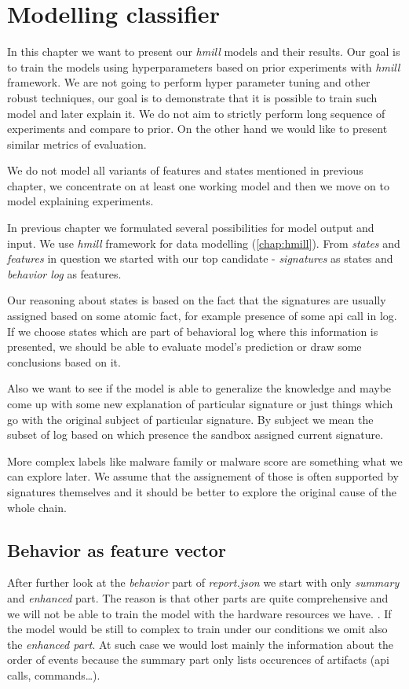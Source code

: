 \chapter{Modelling classifier} \label{chap:models}
In this chapter we want to present our \emph{hmill} models and their results. Our goal is to train the models using hyperparameters based on prior experiments with \emph{hmill} framework. We are not going to perform hyper parameter tuning and other robust techniques, our goal is to demonstrate that it is possible to train such model and later explain it. We do not aim to strictly perform long sequence of experiments and compare to prior. On the other hand we would like to present similar metrics of evaluation. 

We do not model all variants of features and states mentioned in previous chapter, we concentrate on at least one working model and then we move on to model explaining experiments.

In previous chapter we formulated several possibilities for model output and input. We use \emph{hmill} framework for data modelling (\ref{chap:hmill}). From \emph{states} and \emph{features} in question we started with our top candidate - \emph{signatures} as states and \emph{behavior log} as features. 

Our reasoning about states is based on the fact that the signatures are usually assigned based on some atomic fact, for example presence of some api call in log. If we choose states which are part of behavioral log where this information is presented, we should be able to evaluate model's prediction or draw some conclusions based on it. 

Also we want to see if the model is able to generalize the knowledge and maybe come up with some new explanation of particular signature or just things which go with the original subject of particular signature. By subject we mean the subset of log based on which presence the sandbox assigned current signature.

More complex labels like malware family or malware score are something what we can explore later. We assume that the assignement of those is often supported by signatures themselves and it should be better to explore the original cause of the whole chain.

\section{Behavior as feature vector}
After further look at the \emph{behavior} part of \emph{report.json} we start with only \emph{summary} and \emph{enhanced} part. The reason is that other parts are quite comprehensive and we will not be able to train the model with the hardware resources we have. . If the model would be still to complex to train under our conditions we omit also the \emph{enhanced part}. At such case we would lost mainly the information about the order of events because the summary part only lists occurences of artifacts (api calls, commands\dots).

